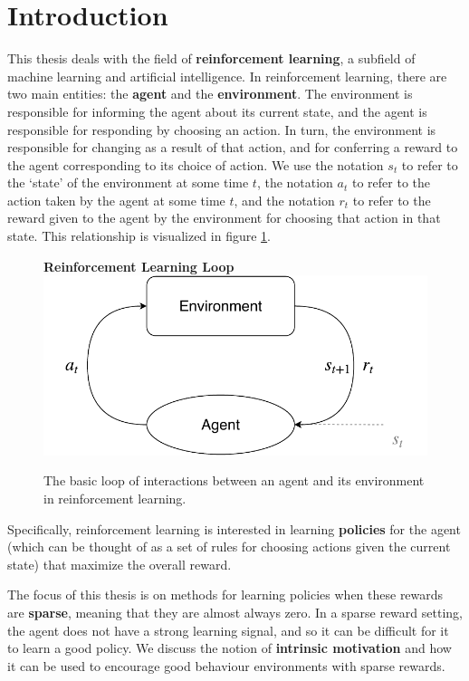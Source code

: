 \documentclass[journal, onecolumn, 12pt, draftclsnofoot]{IEEEtran}
\begin{document}
	\section{Introduction}
	\label{sec:intro}
	\par This thesis deals with the field of \textbf{reinforcement learning}, a subfield of machine learning and artificial intelligence. In reinforcement learning, there are two main entities: the \textbf{agent} and the \textbf{environment}. The environment is responsible for informing the agent about its current state, and the agent is responsible for responding by choosing an action. In turn, the environment is responsible for changing as a result of that action, and for conferring a reward to the agent corresponding to its choice of action.	We use the notation $s_t$ to refer to the `state' of the environment at some time $t$, the notation $a_t$ to refer to the action taken by the agent at some time $t$, and the notation $r_t$ to refer to the reward given to the agent by the environment for choosing that action in that state. This relationship is visualized in figure \ref{fig:rl}.
	\begin{figure}
		\begin{center}
			\textbf{Reinforcement Learning Loop}
		\includegraphics{fig/rl.pdf}
		\end{center}
		\caption{The basic loop of interactions between an agent and its environment in reinforcement learning.}
		\label{fig:rl}
	\end{figure}
	\par Specifically, reinforcement learning is interested in learning \textbf{policies} for the agent (which can be thought of as a set of rules for choosing actions given the current state) that maximize the overall reward.
	\par The focus of this thesis is on methods for learning policies when these rewards are \textbf{sparse}, meaning that they are almost always zero. In a sparse reward setting, the agent does not have a strong learning signal, and so it can be difficult for it to learn a good policy. We discuss the notion of \textbf{intrinsic motivation} and how it can be used to encourage good behaviour environments with sparse rewards.
\end{document}
